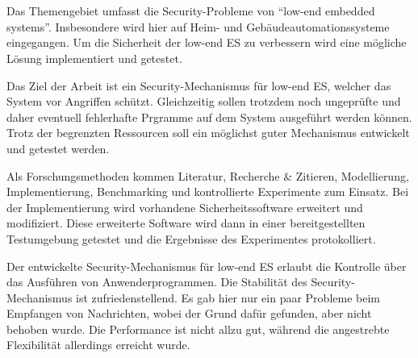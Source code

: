 
%
\section*{\thesisheading} %



 Das Themengebiet umfasst die Security-Probleme von \enquote{low-end embedded systems}. 
Insbesondere wird hier auf Heim- und Gebäudeautomationssysteme eingegangen. Um die Sicherheit der low-end ES zu 
verbessern wird eine mögliche Lösung implementiert und getestet. \cite[Kap.~1]{Flanitzer2008}

 Das Ziel der Arbeit ist ein Security-Mechanismus für low-end ES, welcher das System 
vor Angriffen schützt. Gleichzeitig sollen trotzdem noch ungeprüfte und daher eventuell fehlerhafte Prgramme 
auf dem System ausgeführt werden können. Trotz der begrenzten Ressourcen soll ein möglichst guter Mechanismus 
entwickelt und getestet werden. \cite[Kap.~1]{Flanitzer2008}

 Als Forschungsmethoden kommen Literatur, Recherche \& Zitieren, Modellierung, 
Implementierung, Benchmarking und kontrollierte Experimente zum Einsatz. Bei der Implementierung wird vorhandene
Sicherheitssoftware erweitert und modifiziert. Diese erweiterte Software wird dann in einer bereitgestellten Testumgebung
getestet und die Ergebnisse des Experimentes protokolliert. \cite[Kap.~1,5,6,7]{Flanitzer2008}

 Der entwickelte Security-Mechanismus für low-end ES erlaubt die Kontrolle über das Ausführen von
Anwenderprogrammen. Die Stabilität des Security-Mechanismus ist zufriedenstellend. Es gab hier nur ein paar Probleme beim
Empfangen von Nachrichten, wobei der Grund dafür gefunden, aber nicht behoben wurde. Die Performance ist nicht allzu gut,
während die angestrebte Flexibilität allerdings erreicht wurde. \cite[Kap.~6,7]{Flanitzer2008}


%
\section*{\thesisheading} %

